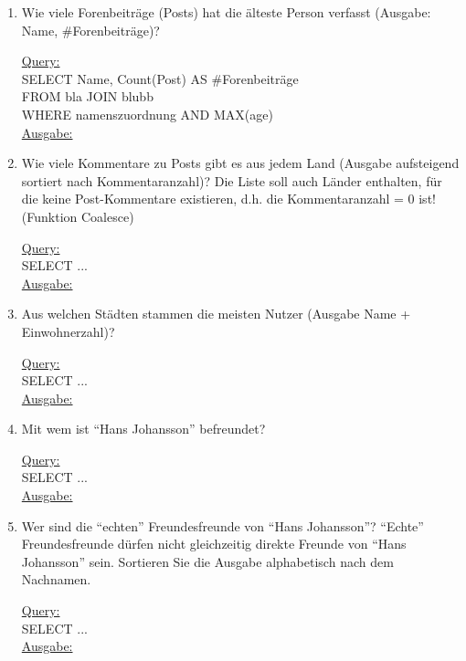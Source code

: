 \begin{enumerate}
    \item Wie viele Forenbeiträge (Posts) hat die älteste Person verfasst (Ausgabe: Name, \#Forenbeiträge)?

    \uline{Query:}\\
    SELECT Name, Count(Post) AS \#Forenbeiträge \\
    FROM bla JOIN blubb \\
    WHERE namenszuordnung AND MAX(age)\\
    \uline{Ausgabe:}\\

    \item Wie viele Kommentare zu Posts gibt es aus jedem Land (Ausgabe aufsteigend sortiert nach Kommentaranzahl)? Die Liste soll auch Länder enthalten, für die keine Post-Kommentare existieren, d.h. die Kommentaranzahl = 0 ist! (Funktion Coalesce)

    \uline{Query:}\\
    SELECT ...\\
    \uline{Ausgabe:}\\

    \item Aus welchen Städten stammen die meisten Nutzer (Ausgabe Name + Einwohnerzahl)?

    \uline{Query:}\\
    SELECT ...\\
    \uline{Ausgabe:}\\

    \item Mit wem ist \enquote{Hans Johansson} befreundet?

    \uline{Query:}\\
    SELECT ...\\
    \uline{Ausgabe:}\\

    \item Wer sind die \enquote{echten} Freundesfreunde von \enquote{Hans Johansson}? \enquote{Echte} Freundesfreunde dürfen nicht gleichzeitig direkte Freunde von \enquote{Hans Johansson} sein. Sortieren Sie die Ausgabe alphabetisch nach dem Nachnamen.

    \uline{Query:}\\
    SELECT ...\\
    \uline{Ausgabe:}\\


\end{enumerate}
